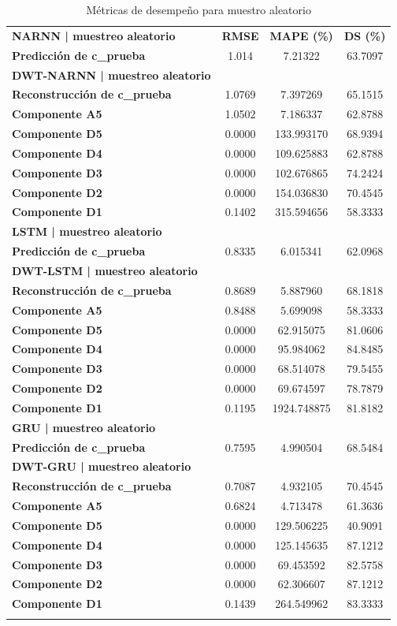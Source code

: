 \begin{longtable}{lccc}
\textbf{NARNN | muestreo aleatorio} & \textbf{RMSE} & \textbf{MAPE (\%)} & \textbf{DS (\%)} \\
\textbf{Predicción de c\_prueba} & 1.014 & 7.21322 & 63.7097 \\
\textbf{DWT-NARNN | muestreo aleatorio} & & & \\
\textbf{Reconstrucción de c\_prueba} & 1.0769 & 7.397269 & 65.1515 \\
\textbf{Componente A5} & 1.0502 & 7.186337 & 62.8788 \\
\textbf{Componente D5} & 0.0000 & 133.993170 & 68.9394 \\
\textbf{Componente D4} & 0.0000 & 109.625883 & 62.8788 \\
\textbf{Componente D3} & 0.0000 & 102.676865 & 74.2424 \\
\textbf{Componente D2} & 0.0000 & 154.036830 & 70.4545 \\
\textbf{Componente D1} & 0.1402 & 315.594656 & 58.3333 \\

\textbf{LSTM | muestreo aleatorio} &  &  &  \\
\textbf{Predicción de c\_prueba} & 0.8335 & 6.015341 & 62.0968 \\
\textbf{DWT-LSTM | muestreo aleatorio} &  &  &  \\
\textbf{Reconstrucción de c\_prueba} & 0.8689 & 5.887960 & 68.1818 \\
\textbf{Componente A5} & 0.8488 & 5.699098 & 58.3333 \\
\textbf{Componente D5} & 0.0000 & 62.915075 & 81.0606 \\
\textbf{Componente D4} & 0.0000 & 95.984062 & 84.8485 \\
\textbf{Componente D3} & 0.0000 & 68.514078 & 79.5455 \\
\textbf{Componente D2} & 0.0000 & 69.674597 & 78.7879 \\
\textbf{Componente D1} & 0.1195 & 1924.748875 & 81.8182 \\

\textbf{GRU | muestreo aleatorio} &  &  &  \\
\textbf{Predicción de c\_prueba} & 0.7595 & 4.990504 & 68.5484 \\
\textbf{DWT-GRU | muestreo aleatorio} &  &  &  \\
\textbf{Reconstrucción de c\_prueba} & 0.7087 & 4.932105 & 70.4545 \\
\textbf{Componente A5} & 0.6824 & 4.713478 & 61.3636 \\
\textbf{Componente D5} & 0.0000 & 129.506225 & 40.9091 \\
\textbf{Componente D4} & 0.0000 & 125.145635 & 87.1212 \\
\textbf{Componente D3} & 0.0000 & 69.453592 & 82.5758 \\
\textbf{Componente D2} & 0.0000 & 62.306607 & 87.1212 \\
\textbf{Componente D1} & 0.1439 & 264.549962 & 83.3333 \\
\caption{Métricas de desempeño para muestro aleatorio}
\label{tab:resultados_prediccion_estandar_m_aleatorio}
    
\end{longtable}

